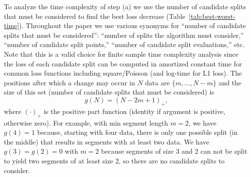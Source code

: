 \documentclass[algorithms,article,accept,oneauthor]{Definitions/mdpi}
\begin{document}
To analyze the time complexity of step (a) we use the number of candidate splits that must be considered to find the best loss decrease (Table~\ref{tab:best-worst-time}).
{Throughout the paper we use various synonyms for ``number of candidate splits that must be considered'': ``number of splits the algorithm must consider,''
``number of candidate split points,''
``number of candidate split evaluations,'' etc.
}
Note that this is a valid choice for finite sample time complexity analysis since the loss of each candidate split can be computed in amortized constant time for common loss functions including square/Poisson (and log-time for L1 loss).
The positions after which a change may occur in $N$ data are $\{m,\dots,N-m\}$ and the size of this set (number of candidate splits that must be considered) is
\begin{equation}
    \label{eq:g}
    g(N) = (N-2m+1)_+,
\end{equation}
where $(\cdot)_+$ is the positive part function (identity if argument is positive, otherwise zero).
For example, with min segment length $m=2$, we have $g(4)=1$ because, starting with four data, there is only one possible split (in the middle) that results in segments with at least two data.
We have $g(3)=g(2)=0$ with $m=2$ because segments of size 3 and 2 can not be split to yield two segments of at least size 2, so there are no candidate splits to consider.
\end{document}
